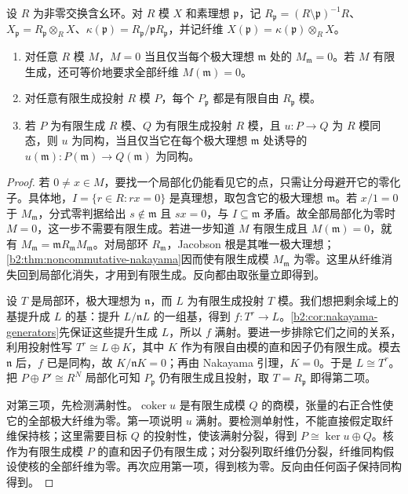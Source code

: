 \begin{lemma}[局部消失与有限投射模]\label{b2:lem:azumaya-local-toolkit}
	设 \(R\) 为非零交换含幺环。对 \(R\) 模 \(X\) 和素理想 \(\mathfrak p\)，记 \(R_{\mathfrak p}=(R\setminus\mathfrak p)^{-1}R\)、\(X_{\mathfrak p}=R_{\mathfrak p}\otimes_RX\)、\(\kappa(\mathfrak p)=R_{\mathfrak p}/\mathfrak pR_{\mathfrak p}\)，并记纤维 \(X(\mathfrak p)=\kappa(\mathfrak p)\otimes_RX\)。
	\begin{enumerate}
		\item 对任意 \(R\) 模 \(M\)，\(M=0\) 当且仅当每个极大理想 \(\mathfrak m\) 处的 \(M_{\mathfrak m}=0\)。若 \(M\) 有限生成，还可等价地要求全部纤维 \(M(\mathfrak m)=0\)。
		\item 对任意有限生成投射 \(R\) 模 \(P\)，每个 \(P_{\mathfrak p}\) 都是有限自由 \(R_{\mathfrak p}\) 模。
		\item 若 \(P\) 为有限生成 \(R\) 模、\(Q\) 为有限生成投射 \(R\) 模，且 \(u:P\rightarrow Q\) 为 \(R\) 模同态，则 \(u\) 为同构，当且仅当它在每个极大理想 \(\mathfrak m\) 处诱导的 \(u(\mathfrak m):P(\mathfrak m)\rightarrow Q(\mathfrak m)\) 为同构。
	\end{enumerate}
\end{lemma}
\begin{proof}
	若 \(0\ne x\in M\)，要找一个局部化仍能看见它的点，只需让分母避开它的零化子。具体地，\(I=\{r\in R:rx=0\}\) 是真理想，取包含它的极大理想 \(\mathfrak m\)。若 \(x/1=0\) 于 \(M_{\mathfrak m}\)，分式零判据给出 \(s\notin\mathfrak m\) 且 \(sx=0\)，与 \(I\subseteq\mathfrak m\) 矛盾。故全部局部化为零时 \(M=0\)，这一步不需要有限生成。若进一步知道 \(M\) 有限生成且 \(M(\mathfrak m)=0\)，就有 \(M_{\mathfrak m}=\mathfrak mR_{\mathfrak m}M_{\mathfrak m}\)。对局部环 \(R_{\mathfrak m}\)，Jacobson 根是其唯一极大理想；\cref{b2:thm:noncommutative-nakayama}因而使有限生成模 \(M_{\mathfrak m}\) 为零。这里从纤维消失回到局部化消失，才用到有限生成。反向都由取张量立即得到。

	设 \(T\) 是局部环，极大理想为 \(\mathfrak n\)，而 \(L\) 为有限生成投射 \(T\) 模。我们想把剩余域上的基提升成 \(L\) 的基：提升 \(L/\mathfrak nL\) 的一组基，得到 \(f:T^r\rightarrow L\)。\cref{b2:cor:nakayama-generators}先保证这些提升生成 \(L\)，所以 \(f\) 满射。要进一步排除它们之间的关系，利用投射性写 \(T^r\cong L\oplus K\)，其中 \(K\) 作为有限自由模的直和因子仍有限生成。模去 \(\mathfrak n\) 后，\(f\) 已是同构，故 \(K/\mathfrak nK=0\)；再由 Nakayama 引理，\(K=0\)。于是 \(L\cong T^r\)。把 \(P\oplus P'\cong R^N\) 局部化可知 \(P_{\mathfrak p}\) 仍有限生成且投射，取 \(T=R_{\mathfrak p}\) 即得第二项。

	对第三项，先检测满射性。\(\operatorname{coker}u\) 是有限生成模 \(Q\) 的商模，张量的右正合性使它的全部极大纤维为零。第一项说明 \(u\) 满射。要检测单射性，不能直接假定取纤维保持核；这里需要目标 \(Q\) 的投射性，使该满射分裂，得到 \(P\cong\ker u\oplus Q\)。核作为有限生成模 \(P\) 的直和因子仍有限生成；对分裂列取纤维仍分裂，纤维同构假设使核的全部纤维为零。再次应用第一项，得到核为零。反向由任何函子保持同构得到。
\end{proof}

